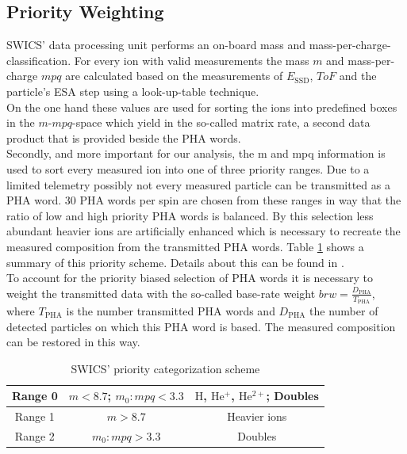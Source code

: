 \subsection{Priority Weighting}
\label{subsec:prio}
SWICS' data processing unit performs an on-board mass and mass-per\--charge-clas\-sification. For every ion with valid measurements the mass $m$ and mass-per-charge $mpq$ are calculated based on the measurements of $E_{\mathrm{SSD}}$, $ToF$ and the particle's ESA step using a look-up-table technique.\\
On the one hand these values are used for sorting the ions into predefined boxes in the $m$-$mpq$-space which yield in the so-called matrix rate, a second data product that is provided beside the PHA words.\\
Secondly, and more important for our analysis, the m and mpq information is used to sort every measured ion into one of three priority ranges. Due to a limited telemetry possibly not every measured particle can be transmitted as a PHA word. 
30 PHA words per spin are chosen from these ranges in way that the ratio of low and high priority PHA words is balanced. By this selection less abundant heavier ions are artificially enhanced which is necessary to recreate the measured composition from the transmitted PHA words. Table \ref{tab} shows a summary of this priority scheme. Details about this can be found in \citet{gloeckler_1992}.\\
To account for the priority biased selection of PHA words it is necessary to weight the transmitted data with the so-called base-rate weight $brw = \frac{D_{\mathrm{PHA}}}{T_{\mathrm{PHA}}}$, where $T_{\mathrm{PHA}}$ is the number transmitted PHA words and $D_{\mathrm{PHA}}$ the number of detected particles on which this PHA word is based. The measured composition can be restored in this way.
\begin{table}[h]
	\caption{SWICS' priority categorization scheme} 
	\centering
	\begin{tabular}{c|c|c}
		Range 0 & $m < 8.7$;  $m_0 : mpq < 3.3$ & $\mathrm{H}$, $\mathrm{He^+}$, $\mathrm{He^{2+}}$; Doubles\\ 
		\hline 
		Range 1 & $m > 8.7$ & Heavier ions \\ 
		\hline 
		Range 2 & $m_0 : mpq > 3.3$ & Doubles \\ 
	\end{tabular} 
	\label{tab}
\end{table}
%
%
%
